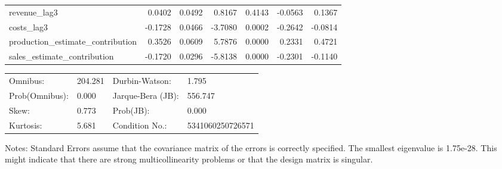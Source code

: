 \begin{table}
\begin{center}
\begin{tabular}{lrrrrrr}
revenue\_lag3                      &  0.0402 &   0.0492 &  0.8167 &      0.4143 & -0.0563 &  0.1367  \\
costs\_lag3                        & -0.1728 &   0.0466 & -3.7080 &      0.0002 & -0.2642 & -0.0814  \\
production\_estimate\_contribution &  0.3526 &   0.0609 &  5.7876 &      0.0000 &  0.2331 &  0.4721  \\
sales\_estimate\_contribution      & -0.1720 &   0.0296 & -5.8138 &      0.0000 & -0.2301 & -0.1140  \\
\hline
\end{tabular}
\end{center}

\begin{center}
\begin{tabular}{llll}
\hline
Omnibus:       & 204.281 & Durbin-Watson:    & 1.795             \\
Prob(Omnibus): & 0.000   & Jarque-Bera (JB): & 556.747           \\
Skew:          & 0.773   & Prob(JB):         & 0.000             \\
Kurtosis:      & 5.681   & Condition No.:    & 5341060250726571  \\
\hline
\end{tabular}
\end{center}
\end{table}
\bigskip
Notes: \newline 
[1] Standard Errors assume that the covariance matrix of the errors is correctly specified. \newline 
[2] The smallest eigenvalue is 1.75e-28. This might indicate that                there are strong multicollinearity problems or that the design                matrix is singular.